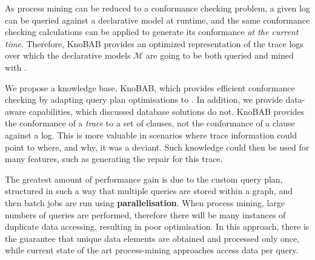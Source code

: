 As process mining can be reduced to a conformance checking problem, a given log can be queried against a declarative model at runtime, and the same conformance checking calculations can be applied to generate its conformance \emph{at the current time}. Therefore, KnoBAB provides an optimized representation of the trace logs over which the declarative models $\mathcal{M}$ are going to be both queried and mined with \LTLf.

We propose a knowledge base, KnoBAB, which provides efficient conformance checking by adapting query plan optimisations \cite{BellatrecheKB21} to \LTLf. In addition, we provide data-aware capabilities, which discussed database solutions do not. KnoBAB provides the conformance of a \emph{trace} to a set of clauses, not the conformance of a clause against a log. This is more valuable in scenarios where trace information could point to where, and why, it was a deviant. Such knowledge could then be used for many features, such as generating the repair for this trace.
\medskip


The greatest amount of performance gain is due to the custom query plan, structured in such a way that multiple queries are stored within a graph, and then batch jobs are run using \textbf{parallelisation}. When process mining, large numbers of queries are performed, therefore there will be many instances of duplicate data accessing, resulting in poor optimisation. In this approach, there is the guarantee that unique data elements are obtained and processed only once, while current state of the art process-mining approaches access data per query. 
\fi



